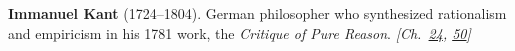 \textbf{Immanuel Kant} (1724–1804). German philosopher who synthesized rationalism and empiricism in his 1781 work, the \emph{Critique of Pure Reason}. \emph{[Ch.~\hyperref[ch:4dspacetime]{24}, \hyperref[ch:consciousness]{50}]}

